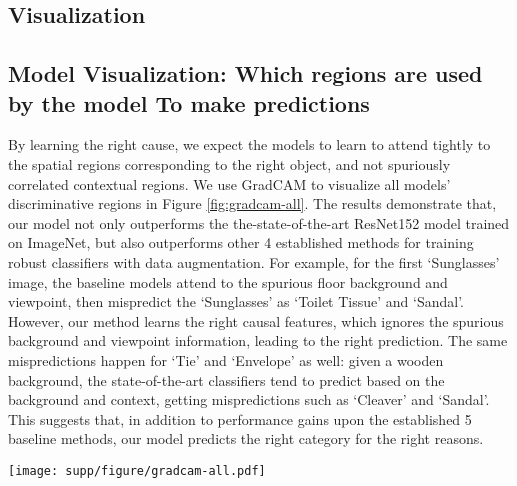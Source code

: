 \documentclass[final]{cvpr}
\begin{document}
\begin{subappendices}
\section{Visualization}

\subsection{Model Visualization: Which regions are used by the model To make predictions}

By learning the right cause, we expect the models to learn to attend tightly to the spatial regions corresponding to the right object, and not spuriously correlated contextual regions. 
We use GradCAM to visualize all models' discriminative regions in Figure \ref{fig:gradcam-all}.
The results demonstrate that, our model not only outperforms the the-state-of-the-art ResNet152 model trained on ImageNet, but also outperforms other 4 established methods \cite{cubuk2018autoaugment, zhang2017mixup, imagenetbiased, CAS} for training robust classifiers with data augmentation. For example, for the first `Sunglasses' image, the baseline models attend to the spurious floor background and viewpoint, then mispredict the `Sunglasses' as `Toilet Tissue' and `Sandal'.  However, our method learns the right causal features, which ignores the spurious background and viewpoint information, leading to the right prediction. The same mispredictions happen for `Tie' and `Envelope' as well: given a wooden background, the state-of-the-art classifiers tend to predict based on the background and context, getting mispredictions such as `Cleaver' and `Sandal'. This suggests that, in addition to performance gains upon the established 5 baseline methods, our model predicts the right category for the right reasons. 

\begin{figure*}
\centering
\texttt{[image: supp/figure/gradcam-all.pdf]}
  \caption{We visualize the input regions that are used to make predictions for 5 baseline models and our models. Blue indicates the model ignores the region for discrimination, while red indicates the region is the key for discriminative. The white text shows the model's top prediction. The baseline frequently latches onto spurious background context, resulting in wrong predictions. While the state-of-the-art data augmentation and robust learning methods cannot attend to the causal region, our model often predicts the right thing for the right reasons.}
\label{fig:gradcam-all}
\end{figure*}









\end{subappendices}
\end{document}
